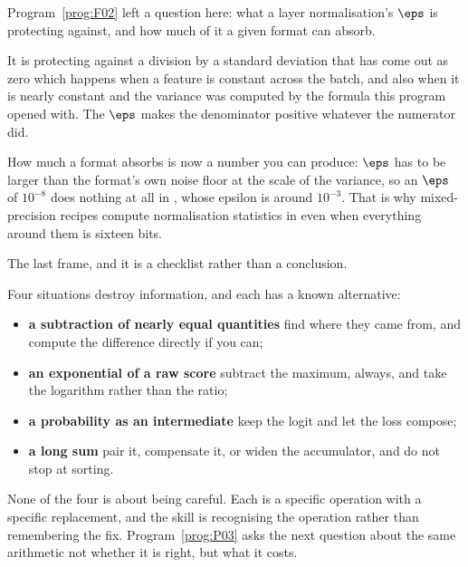 \begin{fr}
\begin{aibox}
Program~\ref{prog:F02} left a question here: what a layer normalisation's
$\eps$ is protecting against, and how much of it a given format can absorb.

It is protecting against a division by a standard deviation that has come out
as zero \dash{} which happens when a feature is constant across the batch, and
also when it is nearly constant and the variance was computed by the formula
this program opened with. The $\eps$ makes the denominator positive whatever
the numerator did.

How much a format absorbs is now a number you can produce: $\eps$ has to be
larger than the format's own noise floor at the scale of the variance, so an
$\eps$ of $10^{-8}$ does nothing at all in , whose epsilon is around
$10^{-3}$. That is why mixed-precision recipes compute normalisation statistics
in  even when everything around them is sixteen bits.
\end{aibox}
\end{fr}

\begin{fr}
The last frame, and it is a checklist rather than a conclusion.

Four situations destroy information, and each has a known alternative:

\begin{itemize}
\item \textbf{a subtraction of nearly equal quantities} \dash{} find where they
  came from, and compute the difference directly if you can;
\item \textbf{an exponential of a raw score} \dash{} subtract the maximum,
  always, and take the logarithm rather than the ratio;
\item \textbf{a probability as an intermediate} \dash{} keep the logit and let
  the loss compose;
\item \textbf{a long sum} \dash{} pair it, compensate it, or widen the
  accumulator, and do not stop at sorting.
\end{itemize}

None of the four is about being careful. Each is a specific operation with a
specific replacement, and the skill is recognising the operation rather than
remembering the fix. Program~\ref{prog:P03} asks the next question about the
same arithmetic \dash{} not whether it is right, but what it costs.
\end{fr}

